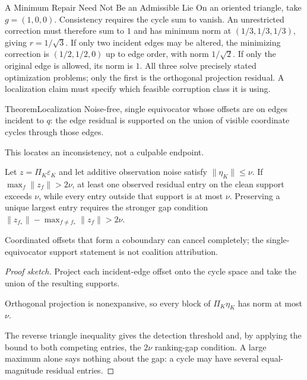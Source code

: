 \documentclass[11pt,a4paper]{article}
\theoremstyle{definition}
\theoremstyle{remark}
\begin{document}
\begin{pdexample}{A Minimum Repair Need Not Be an Admissible Lie}
On an oriented triangle, take $g=(1,0,0)$. Consistency requires the cycle
sum to vanish. An unrestricted correction must therefore sum to $1$ and
has minimum norm at $(1/3,1/3,1/3)$, giving $r=1/\sqrt3$.
If only two incident edges may be altered, the minimizing correction is
$(1/2,1/2,0)$ up to edge order, with norm $1/\sqrt2$.
If only the original edge is allowed, its norm is $1$. All three solve
precisely stated optimization problems; only the first is the orthogonal
projection residual. A localization claim must specify which feasible
corruption class it is using.
\end{pdexample}

\begin{pdclaim}{Theorem}{Localization}
\setlength{\parskip}{4pt plus 1pt}
\label{thm:radius-localization}
Noise-free, single equivocator whose offsets are on edges incident to $q$:
the edge residual is supported on the union of visible coordinate cycles
through those edges. 

This locates an inconsistency, not a culpable endpoint.


Let $z=\Pi_K\varepsilon_K$ and let additive observation noise satisfy
$\|\eta_K\|\le\nu$. If $\max_f\|z_f\|>2\nu$, at least one observed residual
entry on the clean support exceeds $\nu$, while every entry outside that
support is at most $\nu$. Preserving a unique largest entry requires the
stronger gap condition
$\|z_{f_*}\|-\max_{f\ne f_*}\|z_f\|>2\nu$.


Coordinated offsets that form a coboundary can cancel completely; the
single-equivocator support statement is not coalition attribution.
\end{pdclaim}
\begin{proof}[Proof sketch]
\setlength{\parskip}{4pt plus 1pt}
Project each incident-edge offset onto the cycle space and take the union of
the resulting supports. 

Orthogonal projection is nonexpansive, so every block
of $\Pi_K\eta_K$ has norm at most $\nu$. 

The reverse triangle inequality
gives the detection threshold and, by applying the bound to both competing
entries, the $2\nu$ ranking-gap condition. A large maximum alone says nothing
about the gap: a cycle may have several equal-magnitude residual entries.
\end{proof}
\end{document}
